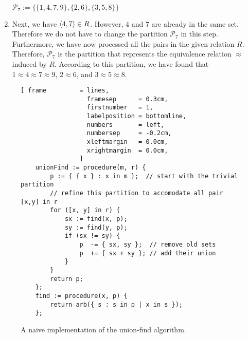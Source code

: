 \begin{enumerate}
      \\[0.2cm]
      \hspace*{1.3cm}
      $\mathcal{P}_7 := \bigl\{ \{1, 4, 7, 9\}, \{2,6\}, \{3,5,8\} \bigr\}$
\item Next, we have $\pair(4,7) \in R$.  However, $4$ and $7$ are already in the same set.
      Therefore we do not have to change the partition $\mathcal{P}_7$ in this step.
      Furthermore, we have now processed all the pairs in the given relation $R$.
      Therefore, $\mathcal{P}_7$ is the partition that represents the equivalence relation $\approx$ induced
      by $R$.  According to this partition, we have found that
      \\[0.2cm]
      \hspace*{1.3cm}
      $1 \approx 4 \approx 7 \approx 9$, \quad $2 \approx 6$,  \quad and \quad $3 \approx 5 \approx 8$.
\end{enumerate}
 

\begin{figure}[!ht]
\centering
\begin{Verbatim}[ frame         = lines, 
                  framesep      = 0.3cm, 
                  firstnumber   = 1,
                  labelposition = bottomline,
                  numbers       = left,
                  numbersep     = -0.2cm,
                  xleftmargin   = 0.0cm,
                  xrightmargin  = 0.0cm,
                ]
    unionFind := procedure(m, r) {
        p := { { x } : x in m };  // start with the trivial partition
        // refine this partition to accomodate all pair [x,y] in r
        for ([x, y] in r) {
            sx := find(x, p);
            sy := find(y, p);
            if (sx != sy) {
                p  -= { sx, sy };  // remove old sets
                p  += { sx + sy }; // add their union
            }
        }
        return p;
    };
    find := procedure(x, p) {
        return arb({ s : s in p | x in s });  
    };
\end{Verbatim}
\vspace*{-0.3cm}
\caption{A naive implementation of the union-find algorithm.}
\label{fig:union-find-naive.stlx}
\end{figure}

